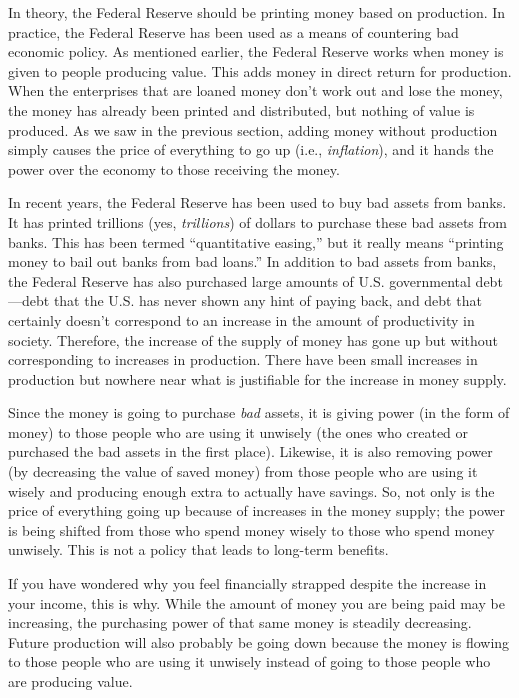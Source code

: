 In theory, the Federal Reserve should be printing money based on
production. In practice, the Federal Reserve has been used as a means
of countering bad economic policy. As mentioned earlier, the Federal
Reserve works when money is given to people producing value. This adds
money in direct return for production. When the enterprises that 
are loaned money don't work out and lose the money, 
the money has already been printed and distributed, but nothing of value is produced. As we saw
in the previous section, adding money without production simply causes
the price of everything to go up (i.e., \textit{inflation}), and it hands the power over the
economy to those receiving the money.

In recent years, the Federal Reserve has been used to buy bad assets
from banks. It has printed trillions (yes, \textit{trillions}) of
dollars to purchase these bad assets from banks. This has been termed
``quantitative easing,'' but it really means ``printing money to bail out
banks from bad loans.''  In addition to bad assets from banks, the
Federal Reserve has also purchased large amounts of U.S. governmental
debt---debt that the U.S. has never shown any hint of paying back, and
debt that certainly doesn't correspond to an increase in the amount
of productivity in society.
Therefore, the increase of the supply of money has gone up but without
corresponding to increases in production. There have been small
increases in production but nowhere near what is justifiable for the
increase in money supply. 

Since the money is going to purchase
\textit{bad} assets, it is giving power (in the form of money) to those
people who are using it unwisely (the ones who created or purchased the
bad assets in the first place).  Likewise, it is also removing power
(by decreasing the value of saved money) from those people who are
using it wisely and
producing enough extra to actually have
savings.  So, not
only is the price of everything going up because of increases in the
money supply; the power is being shifted from those who spend money
wisely to those who spend money unwisely. This is not a policy that
leads to long-term benefits.

If you have wondered why you feel financially strapped despite the
increase in your income, this is why. While the amount of money you are
being paid may be increasing, the purchasing power of that same money
is steadily decreasing. Future production will also probably be going down
because the money is flowing to those people who are using it unwisely
instead of going to those people who are producing value.

